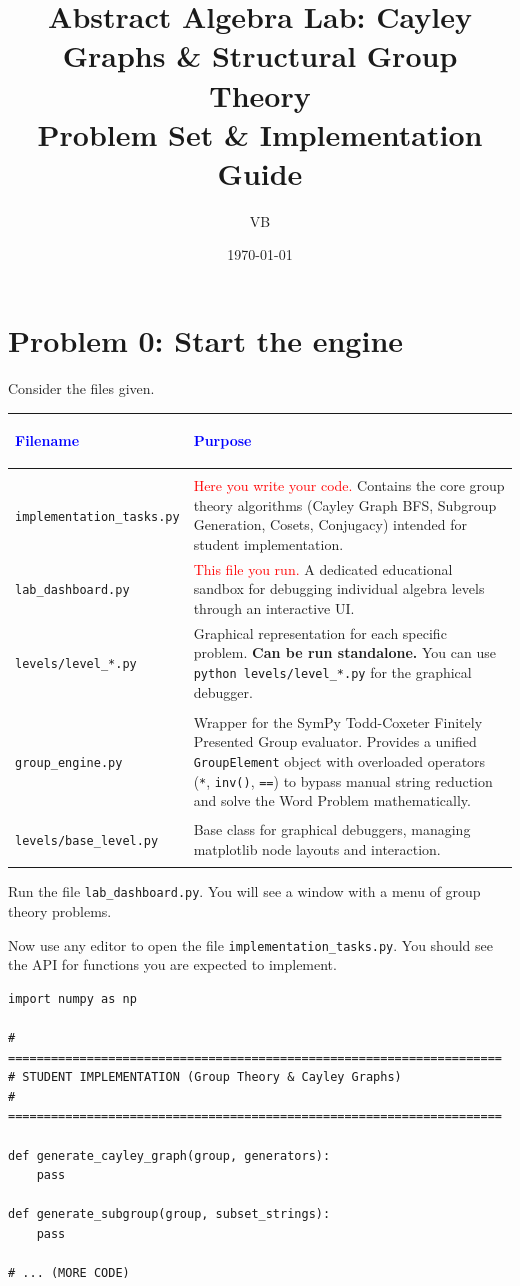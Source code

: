 \documentclass[11pt]{article}
\title{Abstract Algebra Lab: Cayley Graphs \& Structural Group Theory \\ \large Problem Set \& Implementation Guide}
\author{VB}
\date{\today}
\begin{document}
\maketitle

\section*{Problem 0: Start the engine}

Consider the files given.
\begin{center}
\renewcommand{\arraystretch}{1.5}
\begin{tabularx}{\textwidth}{@{} >{\bfseries\raggedright\arraybackslash}p{5.5cm} X @{}}
\toprule
\textcolor{blue}{Filename} & \textcolor{blue}{Purpose} \\ \midrule
\multicolumn{2}{@{}l}{\textbf{Direct Interaction}} \\ \midrule
\lstinline|implementation_tasks.py| & \textcolor{red}{Here you write your code.} Contains the core group theory algorithms (Cayley Graph BFS, Subgroup Generation, Cosets, Conjugacy) intended for student implementation. \\
\lstinline|lab_dashboard.py| & \textcolor{red}{This file you run.} A dedicated educational sandbox for debugging individual algebra levels through an interactive UI. \\
\lstinline|levels/level_*.py| & Graphical representation for each specific problem. \textbf{Can be run standalone.} You can use \lstinline|python levels/level_*.py| for the graphical debugger. \\ \midrule
\multicolumn{2}{@{}l}{\textbf{Under the Hood}} \\ \midrule
\lstinline|group_engine.py| & Wrapper for the SymPy Todd-Coxeter Finitely Presented Group evaluator. Provides a unified \lstinline|GroupElement| object with overloaded operators (\lstinline|*|, \lstinline|inv()|, \lstinline|==|) to bypass manual string reduction and solve the Word Problem mathematically.\\
\lstinline|levels/base_level.py| & Base class for graphical debuggers, managing matplotlib node layouts and interaction.\\
\bottomrule
\end{tabularx}
\end{center}

Run the file \lstinline|lab_dashboard.py|. You will see a window with a menu of group theory problems.

Now use any editor to open the file \lstinline|implementation_tasks.py|. You should see the API for functions you are expected to implement.
\begin{lstlisting}
import numpy as np

# =====================================================================
# STUDENT IMPLEMENTATION (Group Theory & Cayley Graphs)
# =====================================================================

def generate_cayley_graph(group, generators):
    pass

def generate_subgroup(group, subset_strings):
    pass

# ... (MORE CODE)
\end{lstlisting}
\end{document}
